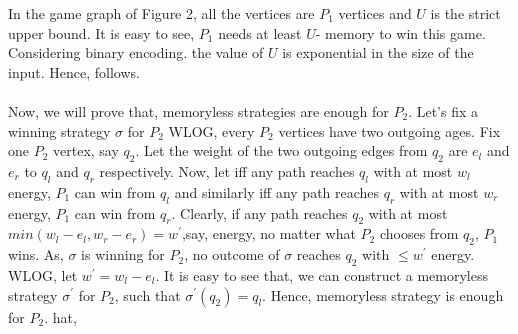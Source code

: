 In the game graph of Figure 2, all the vertices are $P_1$  vertices and $U$ is the strict upper bound. It is easy to see, $P_1$ needs at least $U$- memory to win this game. Considering binary encoding. the value of $U$ is exponential in the size of the input. Hence, follows.\\
\\
Now, we will prove that, memoryless strategies are enough for $P_2$. Let's fix a winning strategy $\sigma$ for $P_2$  WLOG, every $P_2$ vertices have two outgoing ages. Fix one $P_2$ vertex, say $q_2$. Let the weight of the two outgoing edges from $q_2$ are $e_l$ and $e_r$ to $q_l$ and $q_r$ respectively. Now, let iff any path reaches $q_l$ with at most $w_l$ energy, $P_1$ can win from $q_l$ and similarly  iff any path reaches $q_r$ with at most $w_r$ energy, $P_1$ can win from $q_r$. Clearly, if any path reaches $q_2$ with at most $min(w_l-e_l, w_r-e_r)= w^{\prime}$,say, energy, no matter what $P_2$ chooses from $q_2$, $P_1$ wins. As, $\sigma$ is winning for $P_2$, no outcome of $\sigma$ reaches $q_2$ with $\leq w^{\prime}$ energy. WLOG, let $w^{\prime}= w_l -e_l$. It is easy to see that, we can construct a memoryless strategy $\sigma^{\prime}$ for $P_2$, such that $\sigma^{\prime}(q_2)=q_l$. Hence, memoryless strategy is enough for $P_2$.
hat, 